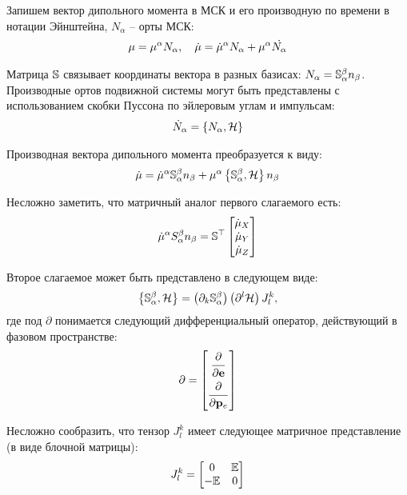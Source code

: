 

Запишем вектор дипольного момента в МСК и его производную по времени в нотации Эйнштейна, $N_\alpha$ -- орты МСК:
\begin{gather}
	\mu = \mu^\alpha N_\alpha, \quad \dot{\mu} = \dot{\mu}^\alpha N_\alpha + \mu^\alpha \dot{N_\alpha} \notag
\end{gather}

Матрица $\mathbb{S}$ связывает координаты вектора в разных базисах: $N_\alpha = \mathbb{S}^\beta_\alpha n_\beta$. Производные ортов подвижной системы могут быть представлены с использованием скобки Пуссона по эйлеровым углам и импульсам:
\begin{gather}
	\dot{N}_\alpha = \left\{ N_\alpha, \mathcal{H} \right\} \notag
\end{gather}

Производная вектора дипольного момента преобразуется к виду:
\begin{gather}
	\dot{\mu} = \dot{\mu}^\alpha \mathbb{S}^\beta_\alpha n_\beta + \mu^\alpha \left\{ \mathbb{S}^\beta_\alpha , \mathcal{H} \right\} n_\beta \notag
\end{gather}

Несложно заметить, что матричный аналог первого слагаемого есть:
\begin{gather}
	\dot{\mu}^\alpha S^\beta_\alpha n_\beta = \mathbb{S}^\top 
	\begin{bmatrix}
		\dot{\mu}_X \\
		\dot{\mu}_Y \\
		\dot{\mu}_Z
	\end{bmatrix} \notag
\end{gather}

Второе слагаемое может быть представлено в следующем виде:
\begin{gather}
	\left\{ \mathbb{S}_\alpha^\beta , \mathcal{H} \right\} = \left( \partial_k \mathbb{S}_\alpha^\beta \right) \left( \partial^l \mathcal{H} \right) J^{k}_{l}, \notag
\end{gather}
где под $\partial$ понимается следующий дифференциальный оператор, действующий в фазовом пространстве: 
\begin{gather}
	\partial = 
	\begin{bmatrix}
		\dfrac{\strut\partial}{\strut\partial \mathbf{e}} \\
		\dfrac{\strut\partial}{\strut\partial \mathbf{p}_e}
	\end{bmatrix} \notag
\end{gather}

Несложно сообразить, что тензор $J^{k}_{l}$ имеет следующее матричное представление (в виде блочной матрицы):
\begin{gather}
	J^{k}_{l} =
	\begin{bmatrix}
		0 & \mathbb{E} \\
		-\mathbb{E} & 0
	\end{bmatrix} \notag
\end{gather}

